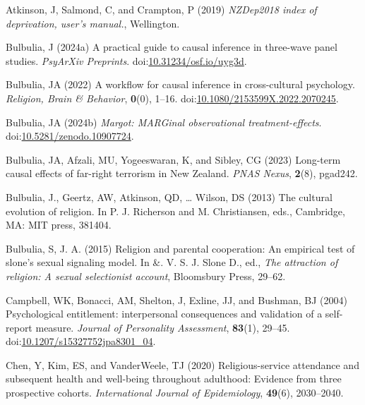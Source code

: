 \documentclass[
  single column]{article}
\newlength{\cslhangindent}
\newenvironment{CSLReferences}[2] %
 {\begin{list}{}{%
  \setlength{\itemindent}{0pt}
  \setlength{\leftmargin}{0pt}
  \setlength{\parsep}{0pt}
  \ifodd #1
   \setlength{\leftmargin}{\cslhangindent}
   \setlength{\itemindent}{-1\cslhangindent}
  \fi
  \setlength{\itemsep}{#2\baselineskip}}}
 {\end{list}}
\begin{document}
\label{refs}
\begin{CSLReferences}{1}{0}
Atkinson, J, Salmond, C, and Crampton, P (2019) \emph{NZDep2018 index of
deprivation, user{'}s manual.}, Wellington.

Bulbulia, J (2024a) A practical guide to causal inference in three-wave
panel studies. \emph{PsyArXiv Preprints}.
doi:\href{https://doi.org/10.31234/osf.io/uyg3d}{10.31234/osf.io/uyg3d}.

Bulbulia, JA (2022) A workflow for causal inference in cross-cultural
psychology. \emph{Religion, Brain \& Behavior}, \textbf{0}(0), 1--16.
doi:\href{https://doi.org/10.1080/2153599X.2022.2070245}{10.1080/2153599X.2022.2070245}.

Bulbulia, JA (2024b) \emph{Margot: MARGinal observational
treatment-effects}.
doi:\href{https://doi.org/10.5281/zenodo.10907724}{10.5281/zenodo.10907724}.

Bulbulia, JA, Afzali, MU, Yogeeswaran, K, and Sibley, CG (2023)
Long-term causal effects of far-right terrorism in {N}ew {Z}ealand.
\emph{PNAS Nexus}, \textbf{2}(8), pgad242.

Bulbulia, J., Geertz, AW, Atkinson, QD, \ldots{} Wilson, DS (2013) The
cultural evolution of religion. In P. J. Richerson and M. Christiansen,
eds., Cambridge, MA: MIT press, 381404.

Bulbulia, S, J. A. (2015) Religion and parental cooperation: An
empirical test of slone's sexual signaling model. In \&. V. S. J. Slone
D., ed., \emph{The attraction of religion: A sexual selectionist
account}, Bloomsbury Press, 29--62.

Campbell, WK, Bonacci, AM, Shelton, J, Exline, JJ, and Bushman, BJ
(2004) Psychological entitlement: interpersonal consequences and
validation of a self-report measure. \emph{Journal of Personality
Assessment}, \textbf{83}(1), 29--45.
doi:\href{https://doi.org/10.1207/s15327752jpa8301_04}{10.1207/s15327752jpa8301\_04}.

Chen, Y, Kim, ES, and VanderWeele, TJ (2020) Religious-service
attendance and subsequent health and well-being throughout adulthood:
Evidence from three prospective cohorts. \emph{International Journal of
Epidemiology}, \textbf{49}(6), 2030--2040.


\end{CSLReferences}
\end{document}
